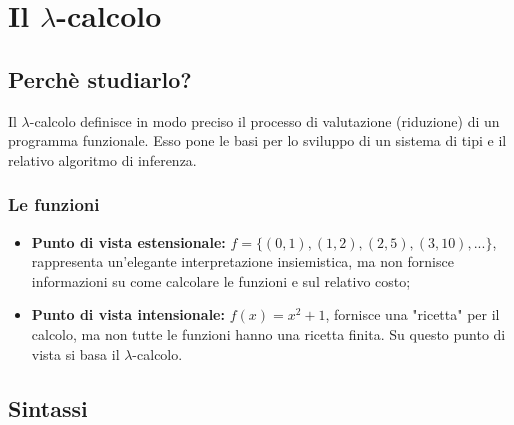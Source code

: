 \chapter{Il \texorpdfstring{$\mathcal{\lambda}$}--calcolo}

\section{Perchè studiarlo?}

Il $\lambda$-calcolo definisce in modo preciso il processo di valutazione (riduzione) di un programma funzionale. Esso pone le basi per lo sviluppo di un sistema di tipi e il relativo algoritmo di inferenza.

\subsection{Le funzioni}

\begin{itemize}
    \item \textbf{Punto di vista estensionale:} $f = \{(0, 1), (1, 2), (2, 5), (3, 10), ...\}$, rappresenta un'elegante interpretazione insiemistica, ma non fornisce informazioni su come calcolare le funzioni e sul relativo costo;
    \item \textbf{Punto di vista intensionale:} $f(x) = x^2 + 1$, fornisce una "ricetta" per il calcolo, ma non tutte le funzioni hanno una ricetta finita. Su questo punto di vista si basa il $\lambda$-calcolo.
\end{itemize}


\section{Sintassi}





